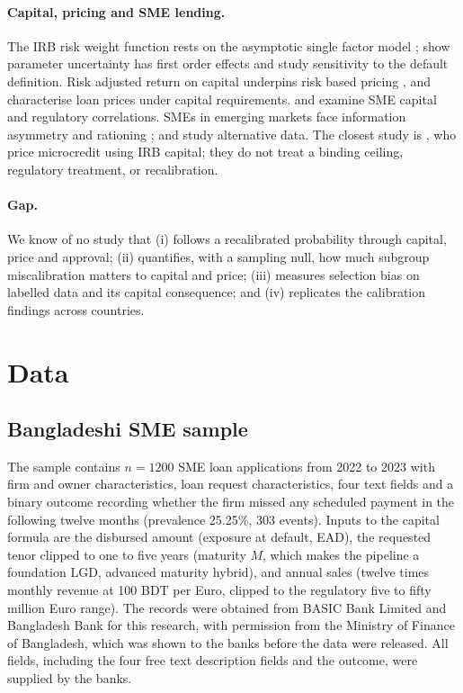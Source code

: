 \documentclass[11pt,a4paper]{article}
\begin{document}
\paragraph{Capital, pricing and SME lending.} The IRB risk weight function rests on the asymptotic single factor model \citep{Vasicek2002,Gordy2003}; \citet{Tarashev2010} show parameter uncertainty has first order effects and \citet{Witzany2008} study sensitivity to the default definition. Risk adjusted return on capital underpins risk based pricing \citep{Froot1998,Stoughton2007,Saunders2010}, and \citet{Repullo2004} characterise loan prices under capital requirements. \citet{Altman2005} and \citet{Vozzella2020} examine SME capital and regulatory correlations. SMEs in emerging markets face information asymmetry and rationing \citep{Beck2006,Berger2006,Petersen1994,StiglitzWeiss1981}; \citet{Bjorkegren2020} and \citet{Berg2020} study alternative data. The closest study is \citet{Durango2024}, who price microcredit using IRB capital; they do not treat a binding ceiling, regulatory treatment, or recalibration.

\paragraph{Gap.} We know of no study that (i) follows a recalibrated probability through capital, price and approval; (ii) quantifies, with a sampling null, how much subgroup miscalibration matters to capital and price; (iii) measures selection bias on labelled data and its capital consequence; and (iv) replicates the calibration findings across countries.

\section{Data}\label{sec:data}
\subsection{Bangladeshi SME sample}
The sample contains $n=1200$ SME loan applications from 2022 to 2023 with firm and owner characteristics, loan request characteristics, four text fields and a binary outcome recording whether the firm missed any scheduled payment in the following twelve months (prevalence 25.25\%, 303 events). Inputs to the capital formula are the disbursed amount (exposure at default, EAD), the requested tenor clipped to one to five years (maturity $M$, which makes the pipeline a foundation LGD, advanced maturity hybrid), and annual sales (twelve times monthly revenue at 100 BDT per Euro, clipped to the regulatory five to fifty million Euro range). The records were obtained from BASIC Bank Limited and Bangladesh Bank for this research, with permission from the Ministry of Finance of Bangladesh, which was shown to the banks before the data were released. All fields, including the four free text description fields and the outcome, were supplied by the banks.
\end{document}
